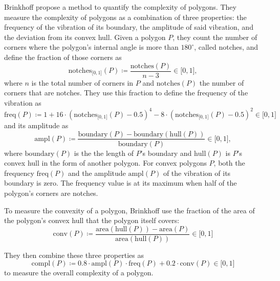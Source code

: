 Brinkhoff \etal{} \cite{brinkhoff1995measuring} propose a method to quantify the complexity of polygons.
They measure the complexity of polygons as a combination of three properties: the frequency of the vibration of its boundary, the amplitude of said vibration, and the deviation from its convex hull.
Given a polygon $P$, they count the number of corners where the polygon's internal angle is more than $180^\circ$, called notches, and define the fraction of those corners as
%
\begin{equation*}
\text{notches}_{\lbrack0,1\rbrack}(P) \coloneqq
\frac{\text{notches}(P)}{n - 3}
\in \lbrack0,1\rbrack
,
\end{equation*}
%
where $n$ is the total number of corners in $P$ and $\text{notches}(P)$ the number of corners that are notches.
They use this fraction to define the frequency of the vibration as
%
\begin{equation*}
\text{freq}(P) \coloneqq 1
+ 16 \cdot (\text{notches}_{\lbrack0,1\rbrack}(P) - 0.5)^4
- 8 \cdot (\text{notches}_{\lbrack0,1\rbrack}(P) - 0.5)^2
\in \lbrack0,1\rbrack
\end{equation*}
%
and its amplitude as
\begin{equation*}
\text{ampl}(P) \coloneqq
\frac{\text{boundary}(P) - \text{boundary}(\text{hull}(P))}{\text{boundary}(P)}
\in \lbrack0,1\rbrack
,
\end{equation*}
%
where $\text{boundary}(P)$ is the the length of $P$'s boundary and $\text{hull}(P)$ is $P$'s convex hull in the form of another polygon.
For convex polygons $P$, both the frequency $\text{freq}(P)$ and the amplitude $\text{ampl}(P)$ of the vibration of its boundary is zero.
The frequency value is at its maximum when half of the polygon's corners are notches.

To measure the convexity of a polygon, Brinkhoff \etal{} use the fraction of the area of the polygon's convex hull that the polygon itself covers:
%
\begin{equation*}
\text{conv}(P) \coloneqq
\frac{\text{area}(\text{hull}(P)) - \text{area}(P)}{\text{area}(\text{hull}(P))}
\in \lbrack0,1\rbrack
\end{equation*}

They then combine these three properties as
\begin{equation}
\text{compl}(P) \coloneqq
0.8 \cdot \text{ampl}(P) \cdot \text{freq}(P) + 0.2 \cdot \text{conv}(P)
\in \lbrack0,1\rbrack
\end{equation}
%
to measure the overall complexity of a polygon.


